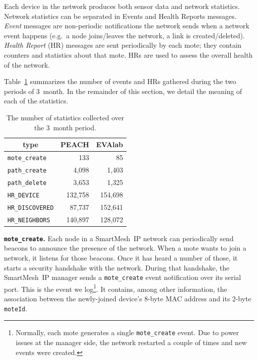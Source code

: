 \documentclass{elsarticle}
\newcommand{\smip}                {SmartMesh~IP\xspace}
\newcommand{\HRNEIGHBORS}         {{\tt HR\_NEIGHBORS}\xspace}
\newcommand{\HRDISCOVERED}        {{\tt HR\_DISCOVERED}\xspace}
\newcommand{\HRDEVICE}            {{\tt HR\_DEVICE}\xspace}
\newcommand{\pathcreate}          {{\tt path\_create}\xspace}
\newcommand{\pathdelete}          {{\tt path\_delete}\xspace}
\newcommand{\motecreate}          {{\tt mote\_create}\xspace}
\newcommand{\moteId}              {{\tt moteId}\xspace}
\newcommand{\PEACHNUMHRNEIGHBORS} {140,897\xspace}
\newcommand{\EVANUMHRNEIGHBORS}   {128,072\xspace}
\begin{document}

Each device in the network produces both sensor data and network statistics.
Network statistics can be separated in Events and Health Reports messages.
\textit{Event} messages are non-periodic notifications the network sends when a network event happens (e.g.~a node joins/leaves the network, a link is created/deleted).
\textit{Health Report} (HR) messages are sent periodically by each mote; they contain counters and statistics about that mote.
HRs are used to assess the overall health of the network.


Table~\ref{tab:msg_stats} summarizes the number of events and HRs gathered during the two periods of 3~month.
In the remainder of this section, we detail the meaning of each of the statistics.

\begin{table}
    \centering
    \begin{tabular}{|l|r|r|}
        \toprule
        \multicolumn{1}{|c|}{type} & \multicolumn{1}{|c|}{PEACH} & \multicolumn{1}{|c|}{EVAlab} \\ \hline
        \hline
        \motecreate     &     133     &   85 \\ \hline
        \pathcreate     &   4,098     &   1,403 \\ \hline
        \pathdelete     &   3,653     &   1,325 \\ \hline
        \HRDEVICE       & 132,758     &   154,698 \\ \hline
        \HRDISCOVERED   &  87,737     &   152,641 \\ \hline
        \HRNEIGHBORS    & \PEACHNUMHRNEIGHBORS & \EVANUMHRNEIGHBORS\\ \hline
    \end{tabular}
    \caption{The number of statistics collected over the 3~month period.}
    \label{tab:msg_stats}
\end{table}

\textbf{\motecreate.}
Each node in a \smip network can periodically send beacons to announce the presence of the network.
When a mote wants to join a network, it listens for those beacons.
Once it has heard a number of those, it starts a security handshake with the network.
During that handshake, the \smip manager sends a \motecreate event notification over its serial port.
This is the event we log\footnote{Normally, each mote generates a single \motecreate event. Due to power issues at the manager side, the network restarted a couple of times and new events were created.}.
It contains, among other information, the association between the newly-joined device's 8-byte MAC address and its 2-byte \moteId.
\end{document}
